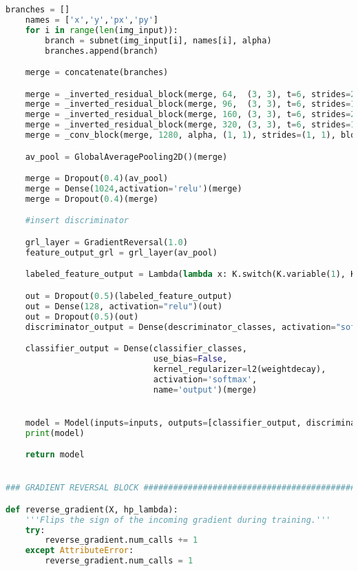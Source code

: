 \begin{lstlisting}[language=Python]
    branches = []
    names = ['x','y','px','py']
    for i in range(len(img_input)):
        branch = subnet(img_input[i], names[i], alpha)
        branches.append(branch)

    merge = concatenate(branches)

    merge = _inverted_residual_block(merge, 64,  (3, 3), t=6, strides=2, n=4, alpha=alpha, block_id=7, name='merge')
    merge = _inverted_residual_block(merge, 96,  (3, 3), t=6, strides=1, n=3, alpha=alpha, block_id=11, name='merge')
    merge = _inverted_residual_block(merge, 160, (3, 3), t=6, strides=2, n=3, alpha=alpha, block_id=14, name='merge')
    merge = _inverted_residual_block(merge, 320, (3, 3), t=6, strides=1, n=1, alpha=alpha, block_id=17, name='merge')
    merge = _conv_block(merge, 1280, alpha, (1, 1), strides=(1, 1), block_id=18, name='merge')

    av_pool = GlobalAveragePooling2D()(merge)

    merge = Dropout(0.4)(av_pool)
    merge = Dense(1024,activation='relu')(merge)
    merge = Dropout(0.4)(merge)

    #insert discriminator

    grl_layer = GradientReversal(1.0)
    feature_output_grl = grl_layer(av_pool)

    labeled_feature_output = Lambda(lambda x: K.switch(K.variable(1), K.concatenate([x[:int(batch_size//2)], x[:int(batch_size//2)]], axis=0), x), output_shape=lambda x: x[0:])(feature_output_grl)

    out = Dropout(0.5)(labeled_feature_output)
    out = Dense(128, activation="relu")(out)
    out = Dropout(0.5)(out)
    discriminator_output = Dense(descriminator_classes, activation="softmax", name="discriminator_output")(out)

    classifier_output = Dense(classifier_classes,
                              use_bias=False,
                              kernel_regularizer=l2(weightdecay),
                              activation='softmax',
                              name='output')(merge)


    model = Model(inputs=inputs, outputs=[classifier_output, discriminator_output], name='mobilenetv2')
    print(model)

    return model


### GRADIENT REVERSAL BLOCK ######################################################################

def reverse_gradient(X, hp_lambda):
    '''Flips the sign of the incoming gradient during training.'''
    try:
        reverse_gradient.num_calls += 1
    except AttributeError:
        reverse_gradient.num_calls = 1


\end{lstlisting}
